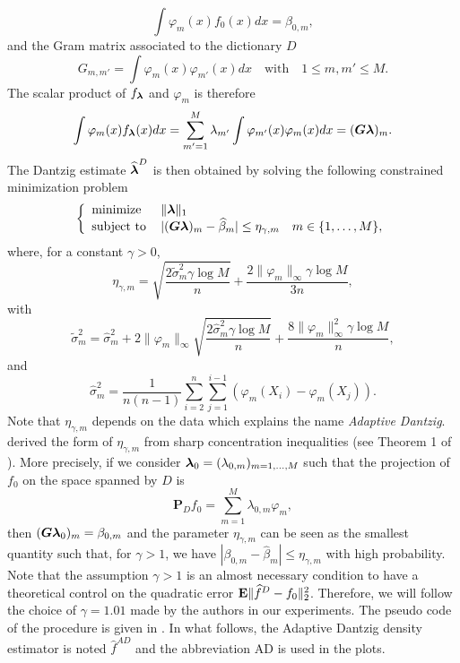 \begin{equation}
      \int \varphi_m(x)f_0(x)dx=\beta_{0,m},
\end{equation}
and the Gram matrix associated to the dictionary $D$
\begin{equation}
    G_{m,m'}=\int\varphi_m(x)\varphi_{m'}(x)dx \quad \text{with}\quad 1\leq m,m' \leq M.
\end{equation}
The scalar product of $f_{\boldsymbol \lambda}$ and $\varphi_m$ is therefore
\begin{equation}
    \int\varphi_m(x)f_{\boldsymbol \lambda}(x)dx = \sum_{m'=1}^M\lambda_{m'}\int\varphi_{m'}(x)\varphi_m(x)dx = (\boldsymbol G\boldsymbol \lambda)_m.
\end{equation}
The Dantzig estimate $\widehat{\boldsymbol \lambda}^D$ is then obtained by solving the following constrained minimization problem
\begin{equation*}
    \left\{
    \begin{array}{ll}
        \text{minimize}\, &\|\boldsymbol \lambda\|_1 \\
        \text{subject to}\, &|(\boldsymbol G\boldsymbol \lambda)_m-\widehat\beta_m|\leq \eta_{\gamma,m} \quad m\in \{1,\dots,M\},
    \end{array} \right.
\end{equation*}
where, for a constant $\gamma > 0$,
\begin{equation}
    \eta_{\gamma,m} = \sqrt{\frac{2\tilde\sigma_m^2\gamma\log{M}}{n}}+ \frac{2\|\varphi_m\|_{\infty}\gamma\log{M}}{3n},
\end{equation}
with
\begin{equation}
    \tilde\sigma_m^2 = \hat\sigma_m^2+2\|\varphi_m \|_{\infty}\sqrt{\frac{2\hat\sigma_m^2\gamma\log{M}}{n}}+ \frac{8\|\varphi_m\|_{\infty}^2\gamma\log{M}}{n},
\end{equation}
and
\begin{equation}
    \hat\sigma^2_m = \frac{1}{n(n-1)}\sum_{i=2}^n\sum_{j=1}^{i-1}(\varphi_m(X_i)-\varphi_m(X_j)).
\end{equation}
Note that $\eta_{\gamma,m}$ depends on the data which explains the name \textit{Adaptive Dantzig}. \citep{Bertin} derived the form of $\eta_{\gamma,m}$ from sharp concentration inequalities (see Theorem 1 of \citep{Bertin}). More precisely, if we consider $\boldsymbol \lambda_0=(\lambda_{0,m})_{m=1,\dots,M}$ such that the projection of $f_0$ on the space spanned by $D$ is
\begin{equation}
    \textbf{P}_{D}f_0=\sum_{m=1}^M\lambda_{0,m}\varphi_m,
\end{equation}
then $(\boldsymbol G\boldsymbol \lambda_0)_m=\beta_{0,m}$ and the parameter $\eta_{\gamma,m}$ can be seen as the smallest quantity such that, for $\gamma > 1$, we have $|\beta_{0,m}-\hat\beta_m|\leq \eta_{\gamma,m}$ with high probability. Note that the assumption $\gamma > 1$ is an almost necessary condition to have a theoretical control on the quadratic error $\mathbf E\|\widehat f^D-f_0 \|^2_2$. Therefore, we will follow the choice of $\gamma=1.01$ made by the authors in our experiments. The pseudo code of the procedure is given in . In what follows, the Adaptive Dantzig density estimator is noted $\hat f ^{AD}$ and the abbreviation AD is used in the plots.

